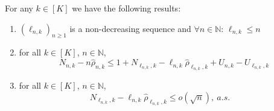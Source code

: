 \begin{lemma}\label{lem:preliminary}
	For any \(k \in [K]\) we have the following results:
	\begin{enumerate}[label=(\roman*)]
		\item \(\left(\ell_{n,k}\right)_{n \geq 1}\) is a non-decreasing sequence and \(\forall n \in \mathbb{N}: \,\ell_{n,k} \leq n\)
		\item for all $k\in [K]$, $n \in \mathbb{N}$,\begin{equation}\label{eq:prelim-4}
			N_{n,k} - n\hat{\rho}_{n,k} \leq 1+N_{\ell_{n,k},k} - \ell_{n,k} \hat{\rho}_{\ell_{n,k},k} + U_{n,k} - U_{\ell_{n,k},k}	
		\end{equation}
		\item for all $k\in [K]$, $n \in \mathbb{N}$,
		\begin{equation}\label{eq:condition}
			N_{\ell_{n,k},k} - \ell_{n,k} \hat{\rho}_{\ell_{n,k},k} \leq o(\sqrt{n}), \ a.s.
			\quad 
		\end{equation}
	\end{enumerate}
\end{lemma}
